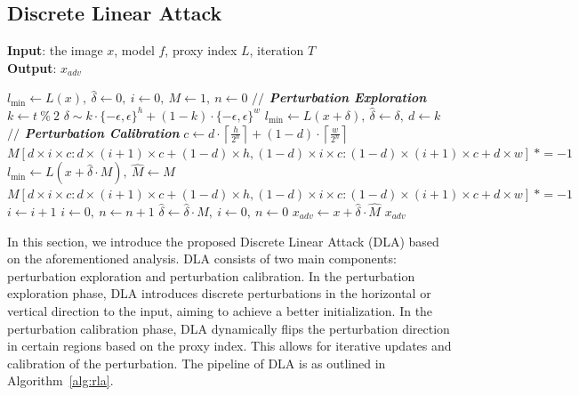 \documentclass[10pt,twocolumn,letterpaper]{article}
\begin{document}
\subsection{Discrete Linear Attack}

\begin{algorithm}[t]
  \caption{Discrete Linear Attack (DLA)}
  \label{alg:rla}
  \textbf{Input}: the image $x$, model $f$, proxy index $L$, iteration $T$
  \\
  \textbf{Output}: $x_{adv}$
  \begin{algorithmic}[1]
    \STATE $l_{\min} \leftarrow L(x),\ \hat{\delta} \leftarrow 0,\ i\leftarrow 0,\ M \leftarrow 1,\ n \leftarrow 0$
    \STATE \textit{\textbf{$//$ Perturbation Exploration}}
    \STATE $k \leftarrow t\ \%\  2$
    \STATE $\delta \sim k \cdot \{-\epsilon, \epsilon\}^h + (1-k) \cdot \{-\epsilon, \epsilon\}^w $
            \STATE $l_{\min} \leftarrow L(x+\delta), \ \hat{\delta} \leftarrow \delta,\ d \leftarrow k$
        \ENDIF
    \ELSE
    \STATE \textit{\textbf{$//$ Perturbation Calibration}}
        \STATE $c \leftarrow d \cdot \left\lceil\frac{h}{2^n}\right\rceil +(1-d)\cdot \left\lceil\frac{w}{2^n}\right\rceil$ 
        \STATE $M[d\times i \times c: d\times (i+1)\times c +(1-d)\times h, (1-d)\times i\times c:(1-d)\times (i+1)\times c+d\times w] \ *= -1$
            \STATE $l_{\min} \leftarrow L(x+\hat{\delta}\cdot M), \ \hat{M} \leftarrow M$
        \ELSE
        \STATE $M[d\times i \times c: d\times (i+1)\times c +(1-d)\times h, (1-d)\times i\times c:(1-d)\times (i+1)\times c+d\times w] \ *= -1$
        \ENDIF
             \STATE $i \leftarrow i+1 $
            \STATE $i\leftarrow0,\ n \leftarrow n +1$
        \ENDIF
        \STATE $\hat{\delta} \leftarrow \hat{\delta} \cdot M,\ i \leftarrow 0,\ n \leftarrow 0$
        \ENDIF
    \ENDIF
  \ENDFOR
  \STATE $x_{adv} \leftarrow x+\hat{\delta}\cdot \hat{M}$
    \RETURN $x_{adv}$
  \end{algorithmic}
\end{algorithm}

In this section, we introduce the proposed Discrete Linear Attack (DLA) based on the aforementioned analysis. DLA consists of two main components: perturbation exploration and perturbation calibration.
In the perturbation exploration phase, DLA introduces discrete perturbations in the horizontal or vertical direction to the input, aiming to achieve a better initialization.
In the perturbation calibration phase, DLA dynamically flips the perturbation direction in certain regions based on the proxy index. This allows for iterative updates and calibration of the perturbation. 
The pipeline of DLA is as outlined in Algorithm~\ref{alg:rla}.
\end{document}
